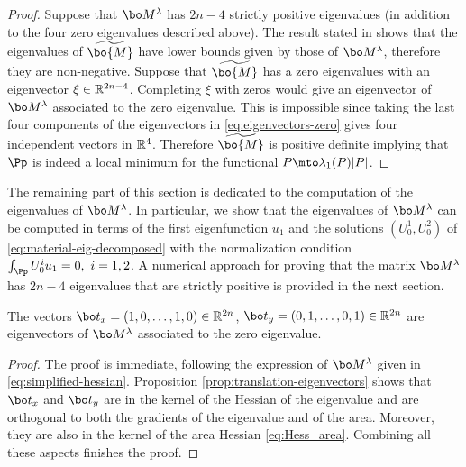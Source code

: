 \begin{proof}
Suppose that $\bo M^\lambda$ has $2n-4$ strictly positive eigenvalues (in addition to the four zero eigenvalues described above). The result stated in \cite[Th.\,4.3.28]{horn-matrix} shows that the eigenvalues of $\widetilde{\bo{M}}$ have lower bounds given by those of $\bo M^\lambda$, therefore they are non-negative. Suppose that $\widetilde{\bo{M}}$ has a zero eigenvalues with an eigenvector $\xi\in \Bbb{R}^{2n-4}$. Completing $\xi$ with zeros would give an eigenvector of $\bo M^\lambda$ associated to the zero eigenvalue. This is impossible since taking the last four components of the eigenvectors in \eqref{eq:eigenvectors-zero} gives four independent vectors in $\Bbb{R}^4$. Therefore $\widetilde{\bo{M}}$ is positive definite implying that $\Pp$ is indeed a local minimum for the functional $P \mto \lambda_1(P)|P|$.
\end{proof}

The remaining part of this section is dedicated to the computation of the eigenvalues of $\bo M^\lambda$. In particular, we show that the eigenvalues of $\bo M^\lambda$ can be computed in terms of the first eigenfunction $u_1$ and the solutions $(U_0^1,U_0^2)$ of \eqref{eq:material-eig-decomposed} with the normalization condition $\int_{\Pp} U_0^i u_1 =0,\ i=1,2$. A numerical approach for proving that the matrix $\bo M^\lambda$ has $2n-4$ eigenvalues that are strictly positive is provided in the next section.

\begin{propo}
The vectors $\bo t_x = (1,0,\dots,1,0) \in \Bbb{R}^{2n}$, $\bo t_y = (0,1,\dots,0,1) \in \Bbb{R}^{2n}$ are eigenvectors of $\bo M^\lambda$ associated to the zero eigenvalue.
\label{prop:tx-ty}
\end{propo}

\begin{proof} The proof is immediate, following the expression of $\bo M^\lambda$ given in \eqref{eq:simplified-hessian}. Proposition \ref{prop:translation-eigenvectors} shows that $\bo t_x$ and $\bo t_y$ are in the kernel of the Hessian of the eigenvalue and are orthogonal to both the gradients of the eigenvalue and of the area. Moreover, they are also in the kernel of the area Hessian \eqref{eq:Hess_area}. Combining all these aspects finishes the proof.
\end{proof}

